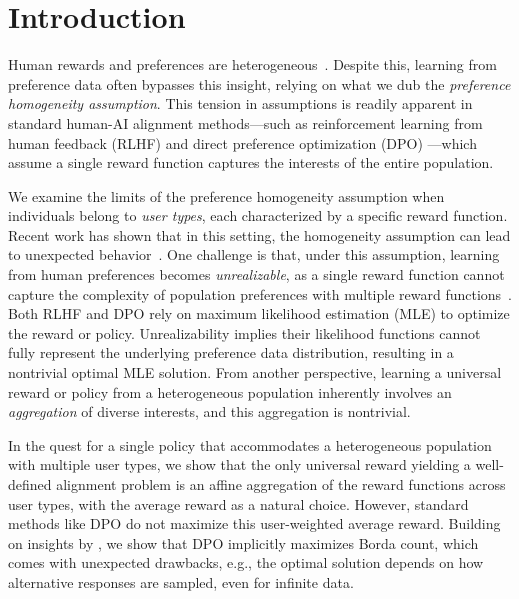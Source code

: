 \section{Introduction}

Human rewards and preferences are heterogeneous~\citep{aroyo2015truth,hetro-1,denton2021whose,hetro-2,zhang_diverging_2024}. Despite this, learning from preference data often bypasses this insight, relying on what we dub the \emph{preference homogeneity assumption}. 
This tension in assumptions is readily apparent in standard human-AI alignment methods---such as reinforcement learning from human feedback (RLHF) \citep{ziegler2019fine,rlhf-summarize,ouyang2022training} and direct preference optimization (DPO) \citep{rafailov2024direct}---which assume a single reward function captures the interests of the entire population.


We examine the limits of the preference homogeneity assumption when individuals belong to \emph{user types}, each characterized by a specific reward function. 
Recent work has shown that in this setting, the homogeneity assumption can lead to unexpected behavior~\citep{conitzer2024social,ge2024axioms,sorensen_roadmap_2024}. One challenge is that, under this assumption, learning from human preferences becomes \emph{unrealizable}, as a single reward function cannot capture the complexity of population preferences with multiple reward functions~\citep{dumoulin2023density,park2024rlhf}. Both RLHF and DPO rely on maximum likelihood estimation (MLE) to optimize the reward or policy. Unrealizability implies their likelihood functions cannot fully represent the underlying preference data distribution, resulting in a nontrivial optimal MLE solution. From another perspective, learning a universal reward or policy from a heterogeneous population inherently involves an \emph{aggregation} of diverse interests, and this aggregation is nontrivial. 

In the quest for a single policy that accommodates a heterogeneous population with multiple user types, we show that the only universal reward yielding a well-defined alignment problem is an affine aggregation of the reward functions across user types, with the average reward as a natural choice. However, standard methods like DPO do not maximize this user-weighted average reward. Building on insights by \citet{siththaranjan2023distributional}, we show that DPO implicitly maximizes Borda count, which comes with unexpected drawbacks, e.g., the optimal solution depends on how alternative responses are sampled, even for infinite data. 


